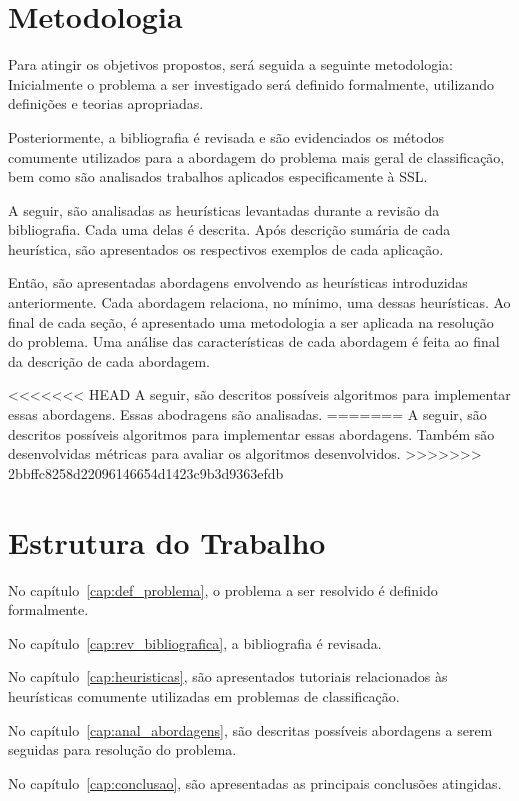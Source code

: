 \section{Metodologia}

Para atingir os objetivos propostos, será seguida a seguinte metodologia:
Inicialmente o problema a ser investigado será definido formalmente,
utilizando definições e teorias apropriadas.

Posteriormente, a bibliografia é revisada e são evidenciados os métodos comumente
utilizados para a abordagem do problema mais geral de classificação, bem como são
analisados trabalhos aplicados especificamente à SSL.

A seguir, são analisadas as heurísticas levantadas durante a
revisão da bibliografia. Cada uma delas é descrita. Após descrição sumária
de cada heurística, são apresentados os respectivos exemplos de cada aplicação.

Então, são apresentadas abordagens envolvendo as heurísticas introduzidas
anteriormente. Cada abordagem relaciona, no mínimo, uma dessas heurísticas.
Ao final de cada seção, é apresentado uma metodologia a ser aplicada
na resolução do problema. Uma análise das características de cada abordagem
é feita ao final da descrição de cada abordagem.

<<<<<<< HEAD
A seguir, são descritos possíveis algoritmos para implementar essas abordagens.
Essas abodragens são analisadas.
=======
A seguir, são descritos possíveis algoritmos para implementar essas abordagens. Também são
desenvolvidas métricas para avaliar os algoritmos desenvolvidos.
>>>>>>> 2bbffc8258d22096146654d1423c9b3d9363efdb


\section{Estrutura do Trabalho}

No capítulo~\ref{cap:def_problema}, o problema a ser resolvido é definido formalmente.

No capítulo~\ref{cap:rev_bibliografica}, a bibliografia é revisada.

No capítulo~\ref{cap:heuristicas}, são apresentados tutoriais relacionados às
heurísticas comumente utilizadas em problemas de classificação.

No capítulo~\ref{cap:anal_abordagens}, são descritas possíveis abordagens a serem
seguidas para resolução do problema.

No capítulo~\ref{cap:conclusao}, são apresentadas as principais conclusões atingidas.
